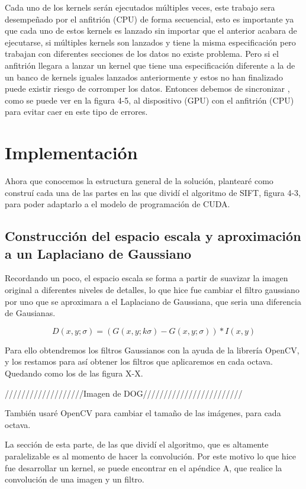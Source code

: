 Cada uno de los kernels serán ejecutados múltiples veces, este trabajo sera desempeñado por el anfitrión (CPU) de forma secuencial, esto es importante ya que cada uno de estos kernels es lanzado sin importar que el anterior acabara de ejecutarse, si múltiples kernels son lanzados y tiene la misma especificación pero trabajan con diferentes secciones de los datos no existe problema. Pero si el anfitrión llegara a lanzar un kernel que tiene una especificación diferente a la de un banco de kernels iguales lanzados anteriormente y estos no han finalizado puede existir riesgo de corromper los datos. Entonces debemos de sincronizar , como se puede ver en la figura 4-5, al  dispositivo (GPU) con el anfitrión (CPU) para evitar caer en este tipo de errores.



\pagebreak
\section{Implementación}

Ahora que conocemos la estructura general de la solución, plantearé como construí cada una de las partes en las que dividí el algoritmo de SIFT, figura 4-3,  para poder adaptarlo a el modelo de programación de CUDA.

\subsection{Construcción del espacio escala y aproximación a un Laplaciano de Gaussiano}

Recordando un poco, el espacio escala se forma a partir de suavizar la imagen original a diferentes niveles de detalles, lo que hice fue cambiar el filtro gaussiano por uno que se aproximara a el Laplaciano de Gaussiana, que seria una diferencia de Gausianas. 

$$D(x,y;\sigma) = (G(x,y;k\sigma) - G(x,y;\sigma)) * I(x,y)$$ 

Para ello obtendremos los filtros Gaussianos con la ayuda de la librería OpenCV, y los restamos para así obtener los filtros que aplicaremos en cada octava. Quedando como los de las figura X-X.

///////////////////Imagen de DOG////////////////////////

También usaré OpenCV para cambiar el tamaño de las imágenes, para cada octava.

La sección de esta parte, de las que dividí el algoritmo, que es altamente paralelizable es al momento de hacer la convolución. Por este motivo lo que hice fue desarrollar un kernel, se puede encontrar en el apéndice A, que realice la convolución de una imagen y un filtro.


